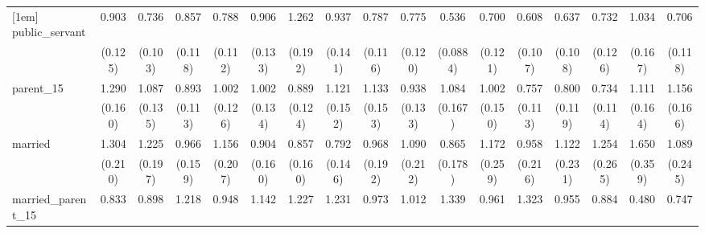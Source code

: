 {\begin{tabular}{l*{16}{c}}
[1em]
public\_servant      &       0.903         &       0.736\sym{*}  &       0.857         &       0.788         &       0.906         &       1.262         &       0.937         &       0.787         &       0.775         &       0.536\sym{***}&       0.700\sym{*}  &       0.608\sym{**} &       0.637\sym{**} &       0.732         &       1.034         &       0.706\sym{*}  \\
                    &     (0.125)         &     (0.103)         &     (0.118)         &     (0.112)         &     (0.133)         &     (0.192)         &     (0.141)         &     (0.116)         &     (0.120)         &    (0.0884)         &     (0.121)         &     (0.107)         &     (0.108)         &     (0.126)         &     (0.167)         &     (0.118)         \\
[1em]
parent\_15           &       1.290\sym{*}  &       1.087         &       0.893         &       1.002         &       1.002         &       0.889         &       1.121         &       1.133         &       0.938         &       1.084         &       1.002         &       0.757         &       0.800         &       0.734\sym{*}  &       1.111         &       1.156         \\
                    &     (0.160)         &     (0.135)         &     (0.113)         &     (0.126)         &     (0.134)         &     (0.124)         &     (0.152)         &     (0.153)         &     (0.133)         &     (0.167)         &     (0.150)         &     (0.113)         &     (0.119)         &     (0.114)         &     (0.164)         &     (0.166)         \\
[1em]
married             &       1.304         &       1.225         &       0.966         &       1.156         &       0.904         &       0.857         &       0.792         &       0.968         &       1.090         &       0.865         &       1.172         &       0.958         &       1.122         &       1.254         &       1.650\sym{*}  &       1.089         \\
                    &     (0.210)         &     (0.197)         &     (0.159)         &     (0.207)         &     (0.160)         &     (0.160)         &     (0.146)         &     (0.192)         &     (0.212)         &     (0.178)         &     (0.259)         &     (0.216)         &     (0.231)         &     (0.265)         &     (0.359)         &     (0.245)         \\
[1em]
married\_parent\_15   &       0.833         &       0.898         &       1.218         &       0.948         &       1.142         &       1.227         &       1.231         &       0.973         &       1.012         &       1.339         &       0.961         &       1.323         &       0.955         &       0.884         &       0.480\sym{**} &       0.747         \\

\end{tabular}}
